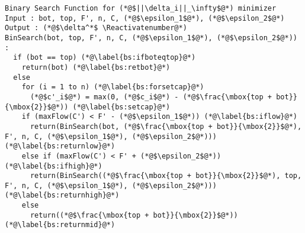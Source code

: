 \Suppressnumber
\begin{lstlisting}[label=binsearch, style=numbers]
Binary Search Function for (*@$||\delta_i||_\infty$@*) minimizer
Input : bot, top, F', n, C, (*@$\epsilon_1$@*), (*@$\epsilon_2$@*)
Output : (*@$\delta^*$ \Reactivatenumber@*)
BinSearch(bot, top, F', n, C, (*@$\epsilon_1$@*), (*@$\epsilon_2$@*)) :
  if (bot == top) (*@\label{bs:ifboteqtop}@*)
    return(bot) (*@\label{bs:retbot}@*)
  else
    for (i = 1 to n) (*@\label{bs:forsetcap}@*)
      (*@$c'_i$@*) = max(0, (*@$c_i$@*) - (*@$\frac{\mbox{top + bot}}{\mbox{2}}$@*)) (*@\label{bs:setcap}@*)
    if (maxFlow(C') < F' - (*@$\epsilon_1$@*)) (*@\label{bs:iflow}@*)
      return(BinSearch(bot, (*@$\frac{\mbox{top + bot}}{\mbox{2}}$@*), F', n, C, (*@$\epsilon_1$@*), (*@$\epsilon_2$@*))) (*@\label{bs:returnlow}@*)
    else if (maxFlow(C') < F' + (*@$\epsilon_2$@*)) (*@\label{bs:ifhigh}@*)
      return(BinSearch((*@$\frac{\mbox{top + bot}}{\mbox{2}}$@*), top, F', n, C, (*@$\epsilon_1$@*), (*@$\epsilon_2$@*))) (*@\label{bs:returnhigh}@*)
    else
      return((*@$\frac{\mbox{top + bot}}{\mbox{2}}$@*)) (*@\label{bs:returnmid}@*)
\end{lstlisting}
